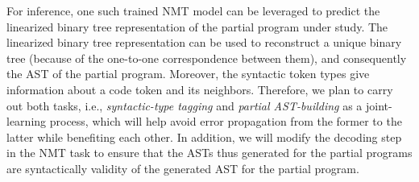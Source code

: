 For inference, one such trained NMT model can be leveraged to predict the linearized binary tree representation of the partial program under study.
The linearized binary tree representation can be used to reconstruct a unique binary tree (because of the one-to-one correspondence between them), and consequently the AST of the partial program. Moreover, the syntactic token types give information about a code token and its neighbors. Therefore, we plan to carry out both tasks, i.e., {\em syntactic-type tagging} and {\em partial AST-building} as a joint-learning process, which will help avoid error propagation from the former to the latter while benefiting each other. In addition, we will modify the decoding step in the NMT task to ensure that the ASTs thus generated for the partial programs are syntactically validity of the generated AST for the partial program.
